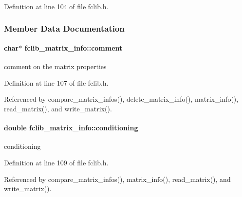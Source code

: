 Definition at line 104 of file fclib.\+h.



\subsubsection{Member Data Documentation}
\hypertarget{structfclib__matrix__info_a9c4994b1759bf3a7a75c72cd78709722}{}
\paragraph[{comment}]{\setlength{\rightskip}{0pt plus 5cm}char$\ast$ fclib\+\_\+matrix\+\_\+info\+::comment}\label{structfclib__matrix__info_a9c4994b1759bf3a7a75c72cd78709722}


comment on the matrix properties 



Definition at line 107 of file fclib.\+h.



Referenced by compare\+\_\+matrix\+\_\+infos(), delete\+\_\+matrix\+\_\+info(), matrix\+\_\+info(), read\+\_\+matrix(), and write\+\_\+matrix().

\hypertarget{structfclib__matrix__info_a453db794429411025f2b8dfb497f5f35}{}
\paragraph[{conditioning}]{\setlength{\rightskip}{0pt plus 5cm}double fclib\+\_\+matrix\+\_\+info\+::conditioning}\label{structfclib__matrix__info_a453db794429411025f2b8dfb497f5f35}


conditioning 



Definition at line 109 of file fclib.\+h.



Referenced by compare\+\_\+matrix\+\_\+infos(), matrix\+\_\+info(), read\+\_\+matrix(), and write\+\_\+matrix().

\hypertarget{structfclib__matrix__info_a9c6697aee458be4494b215f0f003ca48}{}
